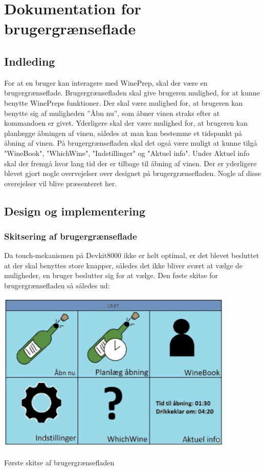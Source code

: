\chapter*{Dokumentation for brugergrænseflade}

\section*{Indleding}

For at en bruger kan interagere med WinePrep, skal der være en brugergrænseflade. Brugergrænsefladen skal give brugeren mulighed, for at kunne benytte WinePreps funktioner. Der skal være mulighed for, at brugeren kan benytte sig af muligheden ”Åbn nu”, som åbner vinen straks efter at kommandoen er givet. Yderligere skal der være mulighed for, at brugeren kan planlægge åbningen af vinen, således at man kan bestemme et tidspunkt på åbning af vinen. På brugergrænsefladen skal det også være muligt at kunne tilgå "WineBook", "WhichWine", "Indstillinger" og "Aktuel info". Under Aktuel info skal der fremgå hvor lang tid der er tilbage til åbning af vinen. Der er yderligere blevet gjort nogle overvejelser over designet på brugergrænsefladen. Nogle af disse overejelser vil blive præsenteret her.

\section*{Design og implementering}
\subsection*{Skitsering af brugergrænseflade}

Da touch-mekanismen på Devkit8000 ikke er helt optimal, er det blevet besluttet at der skal benyttes store knapper, således det ikke bliver svært at vælge de muligheder, en bruger beslutter sig for at vælge. Den føste skitse for brugergrænsefladen så således ud:

\includegraphics{Billeder/skitse}
\caption{Første skitse af brugergrænsefladen}

